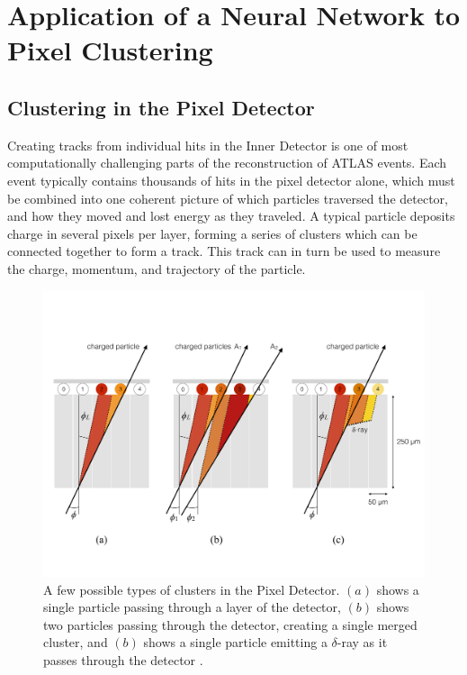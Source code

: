 
\chapter{Application of a Neural Network to Pixel Clustering} %

\label{sec:NN} %



\section{Clustering in the Pixel Detector}

Creating tracks from individual hits in the Inner Detector is one of most computationally challenging parts of the reconstruction of ATLAS events. Each event typically contains thousands of hits in the pixel detector alone, which must be combined into one coherent picture of which particles traversed the detector, and how they moved and lost energy as they traveled. A typical particle deposits charge in several pixels per layer, forming a series of clusters which can be connected together to form a track. This track can in turn be used to measure the charge, momentum, and trajectory of the particle. 


\begin{centering}
\begin{figure}[bth]
\myfloatalign
\includegraphics[width=.90\linewidth]{figures/nn/cluster_types.pdf}
\caption{A few possible types of clusters in the Pixel Detector. $(a)$ shows a single particle passing through a layer of the detector, $(b)$ shows two particles passing through the detector, creating a single merged cluster, and $(b)$ shows a single particle emitting a $\delta$-ray as it passes through the detector \cite{PERF-2012-05}.}
\label{fig:cluster_types}
\end{figure}
\end{centering}

